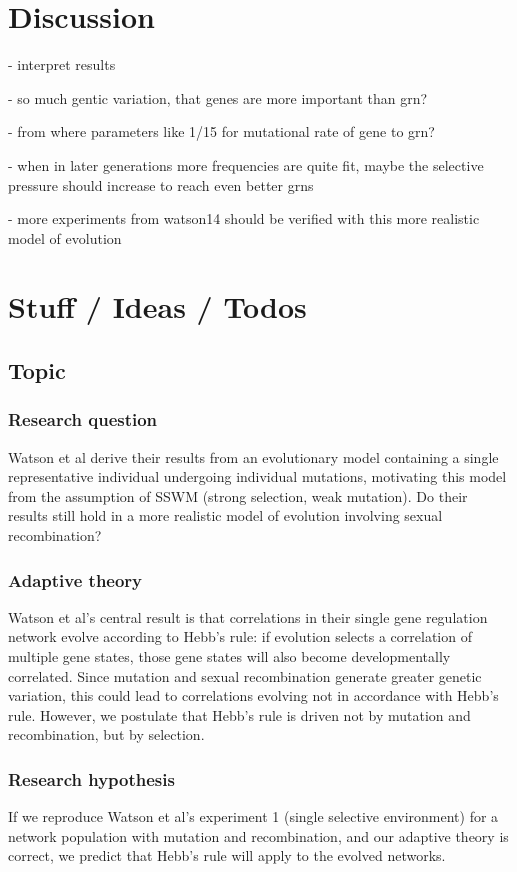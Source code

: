 \documentclass{article}
\begin{document}
\section{Discussion}

- interpret results

- so much gentic variation, that genes are more important than grn?

- from where parameters like 1/15 for mutational rate of gene to grn?

- when in later generations more frequencies are quite fit, maybe the selective pressure should increase to reach even better grns

- more experiments from watson14 should be verified with this more realistic model of evolution


\section{Stuff / Ideas / Todos}

\subsection{Topic}
\subsubsection{Research question}
Watson et al derive their results from an evolutionary model containing a single representative individual undergoing individual mutations, motivating this model from the assumption of SSWM (strong selection, weak mutation). Do their results still hold in a more realistic model of evolution involving sexual recombination?

\subsubsection{Adaptive theory}
Watson et al’s central result is that correlations in their single gene regulation network evolve according to Hebb’s rule: if evolution selects a correlation of multiple gene states, those gene states will also become developmentally correlated. Since mutation and sexual recombination generate greater genetic variation, this could lead to correlations evolving not in accordance with Hebb's rule. However, we postulate that Hebb’s rule is driven not by mutation and recombination, but by selection.

\subsubsection{Research hypothesis}
If we reproduce Watson et al’s experiment 1 (single selective environment) for a network population with mutation and recombination, and our adaptive theory is correct, we predict that Hebb’s rule will apply to the evolved networks.
\end{document}
